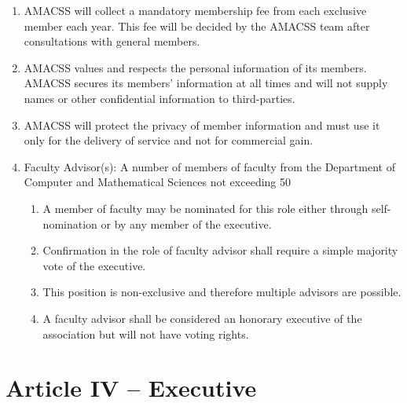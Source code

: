 \documentclass[12pt,a4paper]{article}
\begin{document}
\begin{enumerate}
\item AMACSS will collect a mandatory membership fee from each exclusive member each year. This fee will be decided by the AMACSS team after consultations with general members.

\item AMACSS values and respects the personal information of its members. AMACSS secures its members' information at all times and will not supply names or other confidential information to third-parties.

\item AMACSS will protect the privacy of member information and must use it only for the delivery of service and not for commercial gain.

\item Faculty Advisor(s): A number of members of faculty from the Department of Computer and Mathematical Sciences not exceeding 50%

\begin{enumerate}
\item A member of faculty may be nominated for this role either through self-nomination or by any member of the executive.

\item Confirmation in the role of faculty advisor shall require a simple majority vote of the executive.

\item This position is non-exclusive and therefore multiple advisors are possible.

\item A faculty advisor shall be considered an honorary executive of the association but will not have voting rights.
\end{enumerate}
\end{enumerate}

\section*{Article IV – Executive}
\end{document}
